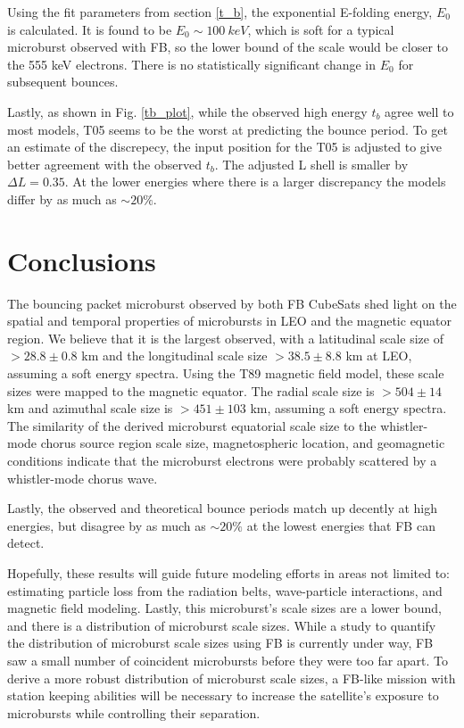 \documentclass[draft,linenumbers]{agujournal}
\begin{document}
Using the fit parameters from section \ref{t_b}, the exponential E-folding energy, $E_0$ is calculated. It is found to be $E_0 \sim 100 \ keV$, which is soft for a typical microburst observed with FB, so the lower bound of the scale would be closer to the 555 keV electrons. There is no statistically significant change in $E_0$ for subsequent bounces.

Lastly, as shown in Fig. \ref{tb_plot}, while the observed high energy $t_b$ agree well to most models, T05 seems to be the worst at predicting the bounce period. To get an estimate of the discrepecy, the input position for the T05 is adjusted to give better agreement with the observed $t_b$. The adjusted L shell is smaller by $\Delta L = 0.35$. At the lower energies where there is a larger discrepancy the models differ by as much as $\sim 20 \%$.


\section{Conclusions}
The bouncing packet microburst observed by both FB CubeSats shed light on the spatial and temporal properties of microbursts in LEO and the magnetic equator region. We believe that it is the largest observed, with a latitudinal scale size of $ > 28.8 \pm 0.8$ km and the longitudinal scale size $ > 38.5 \pm 8.8$ km at LEO, assuming a soft energy spectra. Using the T89 magnetic field model, these scale sizes were mapped to the magnetic equator. The radial scale size is $> 504 \pm​ 14$ km and azimuthal scale size is $> 451 \pm 103$ km, assuming a soft energy spectra. The similarity of the derived microburst equatorial scale size to the whistler-mode chorus source region scale size, magnetospheric location, and geomagnetic conditions indicate that the microburst electrons were probably scattered by a whistler-mode chorus wave.

Lastly, the observed and theoretical bounce periods match up decently at high energies, but disagree by as much as $\sim 20 \%$ at the lowest energies that FB can detect.

Hopefully, these results will guide future modeling efforts in areas not limited to: estimating particle loss from the radiation belts, wave-particle interactions, and magnetic field modeling. Lastly, this microburst's scale sizes are a lower bound, and there is a distribution of microburst scale sizes. While a study to quantify the distribution of microburst scale sizes using FB is currently under way, FB saw a small number of coincident microbursts before they were too far apart. To derive a more robust distribution of microburst scale sizes, a FB-like mission with station keeping abilities will be necessary to increase the satellite's exposure to microbursts while controlling their separation. 
\end{document}
